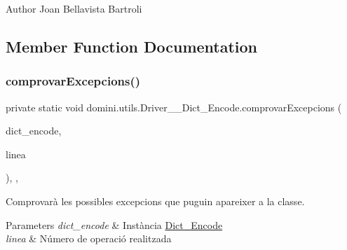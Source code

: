 \begin{DoxyAuthor}{Author}
Joan Bellavista Bartroli 
\end{DoxyAuthor}


\subsection{Member Function Documentation}
\mbox{\label{classdomini_1_1utils_1_1Driver____Dict__Encode_ab67e87f26a75c12e50130a5e5facb52e}} 
\subsubsection{\texorpdfstring{comprovar\+Excepcions()}{comprovarExcepcions()}}
{\footnotesize\ttfamily private static void domini.\+utils.\+Driver\+\_\+\+\_\+\+Dict\+\_\+\+Encode.\+comprovar\+Excepcions (\begin{DoxyParamCaption}\item[{\hyperlink{classdomini_1_1utils_1_1Dict__Encode}{Dict\+\_\+\+Encode}}]{dict\+\_\+encode,  }\item[{String}]{linea }\end{DoxyParamCaption})\hspace{0.3cm}{\ttfamily [inline]}, {\ttfamily [static]}, {\ttfamily [private]}}



Comprovarà les possibles excepcions que puguin apareixer a la classe. 


\begin{DoxyParams}{Parameters}
{\em dict\+\_\+encode} & Instància \hyperlink{classdomini_1_1utils_1_1Dict__Encode}{Dict\+\_\+\+Encode} \\
\hline
{\em linea} & Número de operació realitzada \\
\hline
\end{DoxyParams}
\mbox{\label{classdomini_1_1utils_1_1Driver____Dict__Encode_a67a9ab54d3335c433791b823d192ac8f}} 
